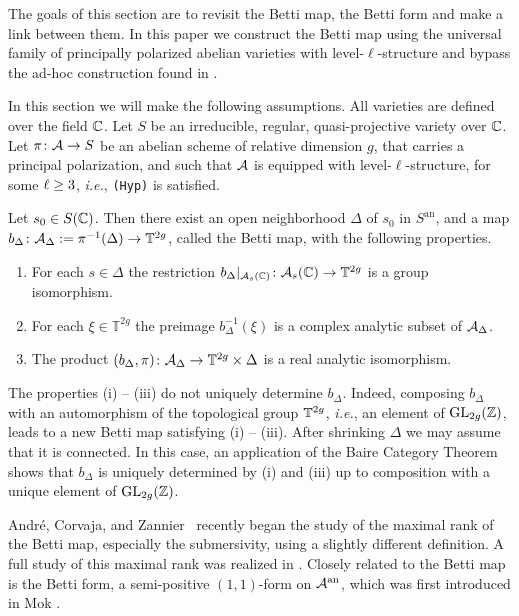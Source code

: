 The goals of this section are to revisit the Betti map, the Betti form and make a link between them. 
In this paper we construct the Betti map using the universal family of
principally polarized abelian varieties with level-$\ell$-structure and
bypass the ad-hoc construction found in \cite{GaoHab}.

 In this section we will make
the following assumptions.
All varieties  are defined over the field ${\mathbb{C}}$.
Let $S$ be an  irreducible, regular, quasi-projective variety over ${\mathbb{C}}$. 
Let $\pi\colon \mathcal{A}\rightarrow S$ be an abelian scheme of  relative
dimension $g$, that carries a principal polarization, and such that
 $\mathcal{A}$ is equipped with level-$\ell$-structure, for some
 $\ell\ge3$, \textit{i.e.}, {\tt (Hyp)} is satisfied. 

\begin{proposition}\label{PropBettiMap}
Let $s_0 \in S({\mathbb{C}})$. Then there exist an open neighborhood $\Delta$ of $s_0$ in $S^{\mathrm{an}}$, and a map $b_{\Delta} \colon \mathcal{A}_{\Delta} := \pi^{-1}(\Delta) \rightarrow \mathbb T^{2g}$, called the Betti map, with the following properties.
\begin{enumerate}
\item[(i)] For each $s \in \Delta$ the restriction $b_{\Delta}|_{\mathcal{A}_s({\mathbb{C}})} \colon \mathcal{A}_s({\mathbb{C}}) \rightarrow \mathbb T^{2g}$ is a group isomorphism.
\item[(ii)] For each $\xi \in \mathbb T^{2g}$ the preimage $b_{\Delta}^{-1}(\xi)$ is a complex analytic subset of $\mathcal{A}_{\Delta}$.
\item[(iii)] The product
$(b_{\Delta},\pi) \colon \mathcal{A}_{\Delta} \rightarrow \mathbb
T^{2g} \times \Delta$ is a real analytic isomorphism.%
\end{enumerate}
\end{proposition}

The properties (i) -- (iii) do not uniquely determine $b_\Delta$.
Indeed,  composing $b_\Delta$ with an automorphism of the
topological group ${\mathbb{T}}^{2g}$, \textit{i.e.}, an element of
$\mathrm{GL}_{2g}({\mathbb{Z}})$, leads to a new Betti map satisfying (i) --
(iii). After shrinking   $\Delta$ we may assume that it is connected.
In this case, an application of the
Baire Category Theorem shows that $b_\Delta$ is
uniquely determined by (i) and (iii)
up to composition with a unique element of $\mathrm{GL}_{2g}({\mathbb{Z}})$.


Andr\'{e}, Corvaja, and Zannier~\cite{ACZBetti} recently began the
study of the maximal rank of the Betti map, especially the submersivity, using a slightly different
definition. A full study of this maximal rank was realized in \cite{GaoBettiRank}. Closely related to the
Betti map is the Betti form, a semi-positive $(1,1)$-form on
${\mathcal{A}}^{\mathrm{an}}$, which was first introduced in Mok \cite{Mok11Form}.

